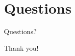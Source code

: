 \documentclass[pdf]{beamer}
\begin{document}
\begin{frame}

\end{frame}




\section{Questions}

\begin{frame}
\tableofcontents[currentsection]
\end{frame}

\begin{frame}
\centering
Questions?
\end{frame}

\begin{frame}
\centering
Thank you!
\end{frame}
\end{document}
